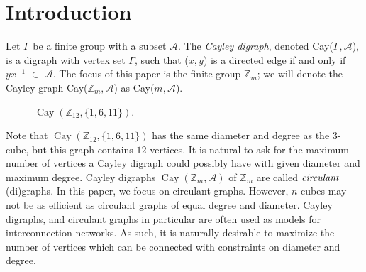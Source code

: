 \documentclass[11pt]{article}
\theoremstyle{definition}
\def\Z{\mbox{$\mathbb Z$}}
\def\Cay{\operatorname{Cay}}
\begin{document}
\section{Introduction}
 
Let $\Gamma$ be a finite group with a subset $\mathscr{A}$. The \emph{Cayley digraph}, denoted Cay($\Gamma, \mathscr{A}$), is a digraph with vertex set $\Gamma$, such that ($x, y$) is a directed edge if and only if $yx^{-1}$ $\in$ $\mathscr{A}$.
The focus of this paper is the finite group $\Z_m$; we will denote the Cayley graph Cay($\Z_m, \mathscr{A}$) as Cay($m, \mathscr{A}$).
 

\begin{figure}[h]
\begin{center}\scriptsize
{}
\caption{ $\Cay(\Z_{12}, \{1, 6, 11\})$.}
\end{center}
\end{figure}
Note that $\Cay(\Z_{12}, \{1, 6, 11\})$ has the same diameter and degree as the $3$-cube, but this graph contains $12$ vertices.  It is natural to ask for the maximum number of vertices a Cayley digraph could possibly have with given diameter and maximum degree.  Cayley digraphs $\Cay(\Z_{m},\mathscr A)$ of $\Z_{m}$ are called $\emph{circulant}$ (di)graphs.  In this paper, we focus on circulant graphs.  However, $n$-cubes may not be as efficient as circulant graphs of equal degree and diameter.  Cayley digraphs, and circulant graphs in particular are often used as models for interconnection networks. As such, it is naturally desirable to maximize the number of vertices which can be connected with constraints on diameter and degree.
\end{document}
